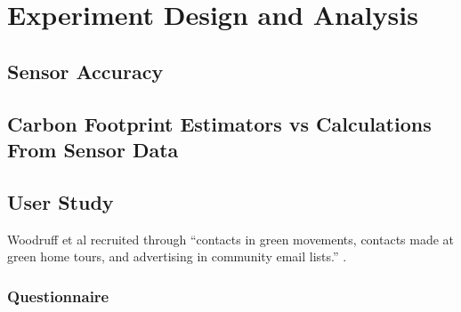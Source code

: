 \chapter{Experiment Design and Analysis}

\section{Sensor Accuracy}

\section{Carbon Footprint Estimators vs Calculations From Sensor Data}

\section{User Study}

Woodruff et al recruited through ``contacts in green movements, contacts made at green home tours, and advertising in community email lists.'' \cite{Woodruff2008-bright-green}.

\subsection{Questionnaire}
